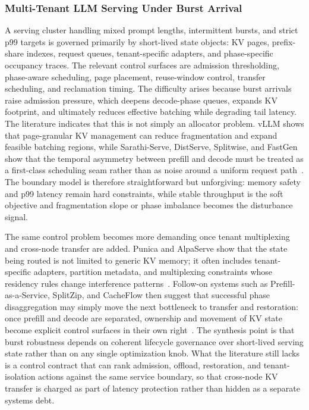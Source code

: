 \documentclass[acmsmall,screen,review]{acmart}
\begin{document}
\subsubsection{Multi-Tenant LLM Serving Under Burst Arrival}

A serving cluster handling mixed prompt lengths, intermittent bursts, and strict p99 targets is governed primarily by short-lived state objects: KV pages, prefix-share indexes, request queues, tenant-specific adapters, and phase-specific occupancy traces. The relevant control surfaces are admission thresholding, phase-aware scheduling, page placement, reuse-window control, transfer scheduling, and reclamation timing. The difficulty arises because burst arrivals raise admission pressure, which deepens decode-phase queues, expands KV footprint, and ultimately reduces effective batching while degrading tail latency. The literature indicates that this is not simply an allocator problem. vLLM shows that page-granular KV management can reduce fragmentation and expand feasible batching regions, while Sarathi-Serve, DistServe, Splitwise, and FastGen show that the temporal asymmetry between prefill and decode must be treated as a first-class scheduling seam rather than as noise around a uniform request path~\cite{kwon2023pagedattention,agrawal2024sarathi,zhong2024distserve,patel2024splitwise,holmes2024fastgen}. The boundary model is therefore straightforward but unforgiving: memory safety and p99 latency remain hard constraints, while stable throughput is the soft objective and fragmentation slope or phase imbalance becomes the disturbance signal.

The same control problem becomes more demanding once tenant multiplexing and cross-node transfer are added. Punica and AlpaServe show that the state being routed is not limited to generic KV memory; it often includes tenant-specific adapters, partition metadata, and multiplexing constraints whose residency rules change interference patterns~\cite{chen2024punica,li2023alpaserve}. Follow-on systems such as Prefill-as-a-Service, SplitZip, and CacheFlow then suggest that successful phase disaggregation may simply move the next bottleneck to transfer and restoration: once prefill and decode are separated, ownership and movement of KV state become explicit control surfaces in their own right~\cite{qin2026prfaas,guo2026splitzip,nian2026cacheflow}. The synthesis point is that burst robustness depends on coherent lifecycle governance over short-lived serving state rather than on any single optimization knob. What the literature still lacks is a control contract that can rank admission, offload, restoration, and tenant-isolation actions against the same service boundary, so that cross-node KV transfer is charged as part of latency protection rather than hidden as a separate systems debt.
\end{document}
